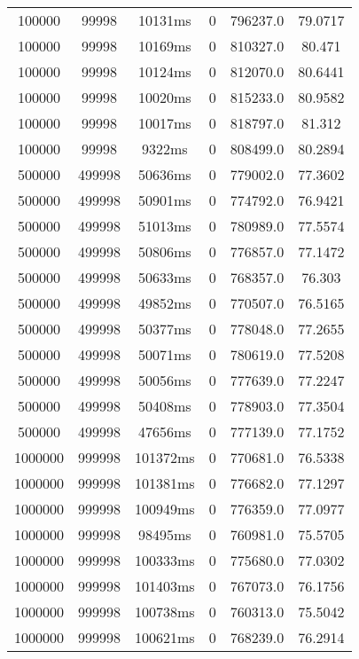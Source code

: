 \documentclass[./main.tex]{subfiles}
\begin{document}
\begin{table}
\begin{tabular}{ c | c | c | c | c | c }
        100000 & 99998 & 10131ms & 0 & 796237.0 & 79.0717 \\
        \rowcolor{lightgray} 100000 & 99998 & 10169ms & 0 & 810327.0 & 80.471 \\
        100000 & 99998 & 10124ms & 0 & 812070.0 & 80.6441 \\
        100000 & 99998 & 10020ms & 0 & 815233.0 & 80.9582 \\
        100000 & 99998 & 10017ms & 0 & 818797.0 & 81.312 \\
        100000 & 99998 & 9322ms & 0 & 808499.0 & 80.2894 \\
        \hline
        500000 & 499998 & 50636ms & 0 & 779002.0 & 77.3602 \\
        500000 & 499998 & 50901ms & 0 & 774792.0 & 76.9421 \\
        500000 & 499998 & 51013ms & 0 & 780989.0 & 77.5574 \\
        500000 & 499998 & 50806ms & 0 & 776857.0 & 77.1472 \\
        500000 & 499998 & 50633ms & 0 & 768357.0 & 76.303 \\
        500000 & 499998 & 49852ms & 0 & 770507.0 & 76.5165 \\
        500000 & 499998 & 50377ms & 0 & 778048.0 & 77.2655 \\
        500000 & 499998 & 50071ms & 0 & 780619.0 & 77.5208 \\
        \rowcolor{lightgray} 500000 & 499998 & 50056ms & 0 & 777639.0 & 77.2247 \\
        500000 & 499998 & 50408ms & 0 & 778903.0 & 77.3504 \\
        500000 & 499998 & 47656ms & 0 & 777139.0 & 77.1752 \\
        \hline
        \rowcolor{lightgray} 1000000 & 999998 & 101372ms & 0 & 770681.0 & 76.5338 \\
        1000000 & 999998 & 101381ms & 0 & 776682.0 & 77.1297 \\
        1000000 & 999998 & 100949ms & 0 & 776359.0 & 77.0977 \\
        1000000 & 999998 & 98495ms & 0 & 760981.0 & 75.5705 \\
        1000000 & 999998 & 100333ms & 0 & 775680.0 & 77.0302 \\
        1000000 & 999998 & 101403ms & 0 & 767073.0 & 76.1756 \\
        1000000 & 999998 & 100738ms & 0 & 760313.0 & 75.5042 \\
        1000000 & 999998 & 100621ms & 0 & 768239.0 & 76.2914 \\

\end{tabular}
\end{table}
\end{document}
